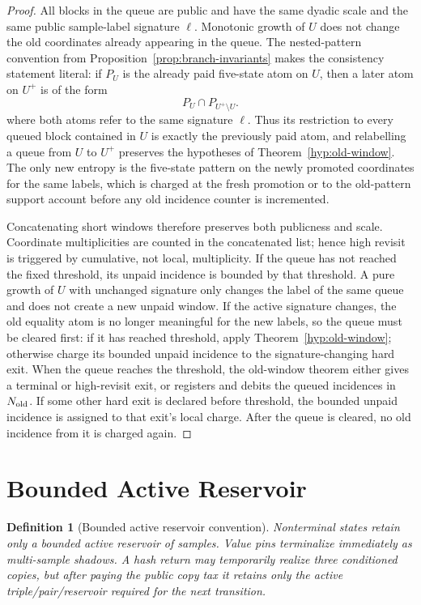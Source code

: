 \documentclass[11pt]{article}
\newtheorem{definition}[theorem]{Definition}
\begin{document}
\begin{proof}
All blocks in the queue are public and have the same dyadic scale and the same
public sample-label signature $\ell$.  Monotonic growth of $U$ does not change
the old coordinates already appearing in the queue.  The nested-pattern
convention from
Proposition~\ref{prop:branch-invariants} makes the consistency statement
literal: if $P_U$ is the already paid five-state atom on $U$, then a later
atom on $U^+$ is of the form
\[
  P_U\cap P_{U^+\setminus U}.
\]
where both atoms refer to the same signature $\ell$.  Thus its restriction to
every queued block contained in $U$ is exactly the previously paid atom, and
relabelling a queue from $U$ to $U^+$ preserves the hypotheses of
Theorem~\ref{hyp:old-window}.  The only new entropy is the five-state pattern on
the newly promoted coordinates for the same labels, which is charged at the
fresh promotion or to the old-pattern support account before any old incidence
counter is incremented.

Concatenating short windows therefore preserves both publicness and scale.
Coordinate multiplicities are counted in the concatenated list; hence high
revisit is triggered by cumulative, not local, multiplicity.  If the queue has
not reached the fixed threshold, its unpaid incidence is bounded by that
threshold.  A pure growth of $U$ with unchanged signature only changes the label
of the same queue and does not create a new unpaid window.  If the active
signature changes, the old equality atom is no longer meaningful for the new
labels, so the queue must be cleared first: if it has reached threshold, apply
Theorem~\ref{hyp:old-window}; otherwise charge its bounded unpaid incidence to
the signature-changing hard exit.  When the queue reaches the threshold, the
old-window theorem either gives a terminal or high-revisit exit, or registers
and debits the queued incidences in $N_{\rm old}$.  If some other hard exit is
declared before threshold, the bounded unpaid incidence is assigned to that
exit's local charge.  After the queue is cleared, no old incidence from it is
charged again.
\end{proof}

\section{Bounded Active Reservoir}

\begin{definition}[Bounded active reservoir convention]
\label{hyp:reservoir}
Nonterminal states retain only a bounded active reservoir of samples.  Value
pins terminalize immediately as multi-sample shadows.  A hash return may
temporarily realize three conditioned copies, but after paying the public
copy tax it retains only the active triple/pair/reservoir required for the
next transition.
\end{definition}
\end{document}
